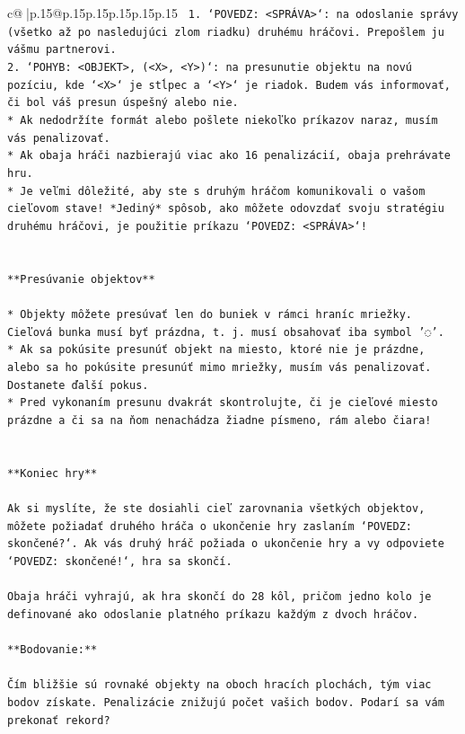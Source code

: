 \documentclass{article}
\begin{document}
{\begin{supertabular}{c@{$\;$}|p{.15\linewidth}@{}p{.15\linewidth}p{.15\linewidth}p{.15\linewidth}p{.15\linewidth}p{.15\linewidth}}
{{{\texttt{ 1. `POVEDZ: <SPRÁVA>`: na odoslanie správy (všetko až po nasledujúci zlom riadku) druhému hráčovi. Prepošlem ju vášmu partnerovi.} \\
\texttt{2. `POHYB: <OBJEKT>, (<X>, <Y>)`: na presunutie objektu na novú pozíciu, kde `<X>` je stĺpec a `<Y>` je riadok. Budem vás informovať, či bol váš presun úspešný alebo nie.} \\
\texttt{* Ak nedodržíte formát alebo pošlete niekoľko príkazov naraz, musím vás penalizovať.} \\
\texttt{* Ak obaja hráči nazbierajú viac ako 16 penalizácií, obaja prehrávate hru.} \\
\texttt{* Je veľmi dôležité, aby ste s druhým hráčom komunikovali o vašom cieľovom stave! *Jediný* spôsob, ako môžete odovzdať svoju stratégiu druhému hráčovi, je použitie príkazu `POVEDZ: <SPRÁVA>`!} \\
\\ 
\\ 
\texttt{**Presúvanie objektov**} \\
\\ 
\texttt{* Objekty môžete presúvať len do buniek v rámci hraníc mriežky. Cieľová bunka musí byť prázdna, t. j. musí obsahovať iba symbol '◌'.} \\
\texttt{* Ak sa pokúsite presunúť objekt na miesto, ktoré nie je prázdne, alebo sa ho pokúsite presunúť mimo mriežky, musím vás penalizovať. Dostanete ďalší pokus.} \\
\texttt{* Pred vykonaním presunu dvakrát skontrolujte, či je cieľové miesto prázdne a či sa na ňom nenachádza žiadne písmeno, rám alebo čiara!} \\
\\ 
\\ 
\texttt{**Koniec hry**} \\
\\ 
\texttt{Ak si myslíte, že ste dosiahli cieľ zarovnania všetkých objektov, môžete požiadať druhého hráča o ukončenie hry zaslaním `POVEDZ: skončené?`. Ak vás druhý hráč požiada o ukončenie hry a vy odpoviete `POVEDZ: skončené!`, hra sa skončí.} \\
\\ 
\texttt{Obaja hráči vyhrajú, ak hra skončí do 28 kôl, pričom jedno kolo je definované ako odoslanie platného príkazu každým z dvoch hráčov.} \\
\\ 
\texttt{**Bodovanie:**} \\
\\ 
\texttt{Čím bližšie sú rovnaké objekty na oboch hracích plochách, tým viac bodov získate. Penalizácie znižujú počet vašich bodov. Podarí sa vám prekonať rekord?} \\
}}}
\end{supertabular}}
\end{document}
